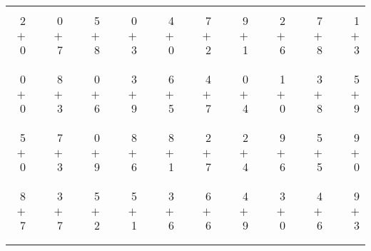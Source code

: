 \documentclass[12pt, letterpaper]{article}
\begin{document}
\begin{tabular}{rrrrrrrrrrrrrrrrrrr}
\cline{1-1} \cline{3-3} \cline{5-5} \cline{7-7} \cline{9-9} \cline{11-11} \cline{13-13} \cline{15-15} \cline{17-17} \cline{19-19} \\ \\
2 & & 0 & & 5 & & 0 & & 4 & & 7 & & 9 & & 2 & & 7 & & 1\\
$+$ 0 & & $+$ 7 & & $+$ 8 & & $+$ 3 & & $+$ 0 & & $+$ 2 & & $+$ 1 & & $+$ 6 & & $+$ 8 & & $+$ 3\\
\cline{1-1} \cline{3-3} \cline{5-5} \cline{7-7} \cline{9-9} \cline{11-11} \cline{13-13} \cline{15-15} \cline{17-17} \cline{19-19} \\ \\
0 & & 8 & & 0 & & 3 & & 6 & & 4 & & 0 & & 1 & & 3 & & 5\\
$+$ 0 & & $+$ 3 & & $+$ 6 & & $+$ 9 & & $+$ 5 & & $+$ 7 & & $+$ 4 & & $+$ 0 & & $+$ 8 & & $+$ 9\\
\cline{1-1} \cline{3-3} \cline{5-5} \cline{7-7} \cline{9-9} \cline{11-11} \cline{13-13} \cline{15-15} \cline{17-17} \cline{19-19} \\ \\
5 & & 7 & & 0 & & 8 & & 8 & & 2 & & 2 & & 9 & & 5 & & 9\\
$+$ 0 & & $+$ 3 & & $+$ 9 & & $+$ 6 & & $+$ 1 & & $+$ 7 & & $+$ 4 & & $+$ 6 & & $+$ 5 & & $+$ 0\\
\cline{1-1} \cline{3-3} \cline{5-5} \cline{7-7} \cline{9-9} \cline{11-11} \cline{13-13} \cline{15-15} \cline{17-17} \cline{19-19} \\ \\
8 & & 3 & & 5 & & 5 & & 3 & & 6 & & 4 & & 3 & & 4 & & 9\\
$+$ 7 & & $+$ 7 & & $+$ 2 & & $+$ 1 & & $+$ 6 & & $+$ 6 & & $+$ 9 & & $+$ 0 & & $+$ 6 & & $+$ 3\\
\cline{1-1} \cline{3-3} \cline{5-5} \cline{7-7} \cline{9-9} \cline{11-11} \cline{13-13} \cline{15-15} \cline{17-17} \cline{19-19} \\ \\
\end{tabular}
\newpage
\end{document}
